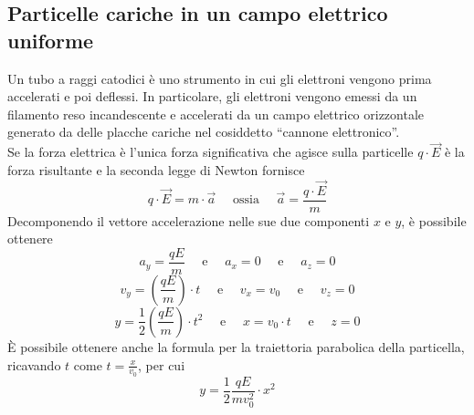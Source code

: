 \documentclass[a4paper]{extarticle}
\newcommand{\quotes}[1]{``#1''}
\begin{document}
\vspace{1em}
\subsection{Particelle cariche in un campo elettrico uniforme}
Un tubo a raggi catodici è uno strumento in cui gli elettroni vengono prima accelerati e poi deflessi. In particolare, gli elettroni vengono emessi da un filamento reso incandescente e accelerati da un campo elettrico orizzontale generato da delle placche cariche nel cosiddetto \quotes{cannone elettronico}.\\
Se la forza elettrica è l'unica forza significativa che agisce sulla particelle $q \cdot \vec E$ è la forza risultante e la seconda legge di Newton fornisce
\[q \cdot \vec E = m \cdot \vec a \hspace{1em} \text{ ossia } \hspace{1em} \vec a = \frac{q \cdot \vec E}{m}\]
Decomponendo il vettore accelerazione nelle sue due componenti $x$ e $y$, è possibile ottenere
\[a_y = \frac{q E}{m} \hspace{1em} \text{ e } \hspace{1em} a_x=0 \hspace{1em} \text{ e } \hspace{1em} a_z=0\]
\[v_y = \left(\frac{qE}{m}\right) \cdot t \hspace{1em} \text{ e } \hspace{1em} v_x=v_0 \hspace{1em} \text{ e } \hspace{1em} v_z=0\]
\[y=\frac{1}{2} \left(\frac{q E}{m}\right) \cdot t^2 \hspace{1em} \text{ e } \hspace{1em} x=v_0 \cdot t \hspace{1em} \text{ e } \hspace{1em} z=0\]
È possibile ottenere anche la formula per la traiettoria parabolica della particella, ricavando $t$ come $t=\frac{x}{v_0}$, per cui
\[\boxed{y=\frac{1}{2} \frac{q E}{m v_0^2} \cdot x^2}\]

\vspace{1em}
\noindent
\end{document}
